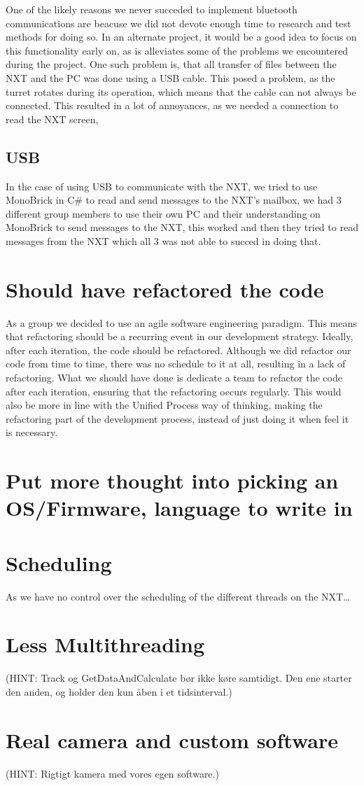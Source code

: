 One of the likely reasons we never succeded to implement bluetooth
communications are beacuse we did not devote enough time to research and test
methods for doing so. In an alternate project, it would be a good idea to focus
on this functionality early on, as is alleviates some of the problems we
encountered during the project. One such problem is, that all transfer of files
between the NXT and the PC was done using a USB cable. This posed a problem, as
the turret rotates during its operation, which means that the cable can not
always be connected. This resulted in a lot of annoyances, as we needed a
connection to read the NXT screen, 


\subsection{USB}
In the case of using USB to communicate with the NXT, we tried to use MonoBrick
\cite{MonoBrick} in C\# to read and send messages to the NXT's mailbox, we had 3
different group members to use their own PC and their understanding on MonoBrick
to send messages to the NXT, this worked and then they tried to read messages
from the NXT which all 3 was not able to succed in doing that. 
 


\section{Should have refactored the code}
As a group we decided to use an agile software engineering paradigm. This means that
refactoring should be a recurring event in our development strategy. Ideally, after each iteration, the code should be refactored. Although we did refactor our code from time to time, there was no schedule to it at all, resulting in a lack of refactoring. What we should have done is dedicate a team to refactor the code after each iteration, ensuring that the refactoring occurs regularly. This would also be more in line with the Unified Process way of thinking, making the refactoring part of the development process, instead of just doing it when feel it is necessary.

\section{Put more thought into picking an OS/Firmware, language to write in}

\section{Scheduling}
As we have no control over the scheduling of the different threads on the NXT\ldots

\section{Less Multithreading}


(HINT: Track og GetDataAndCalculate bør ikke køre samtidigt. Den ene starter
  den anden, og holder den kun åben i et tidsinterval.)

\section{Real camera and custom software}
(HINT: Rigtigt kamera med vores egen software.)

